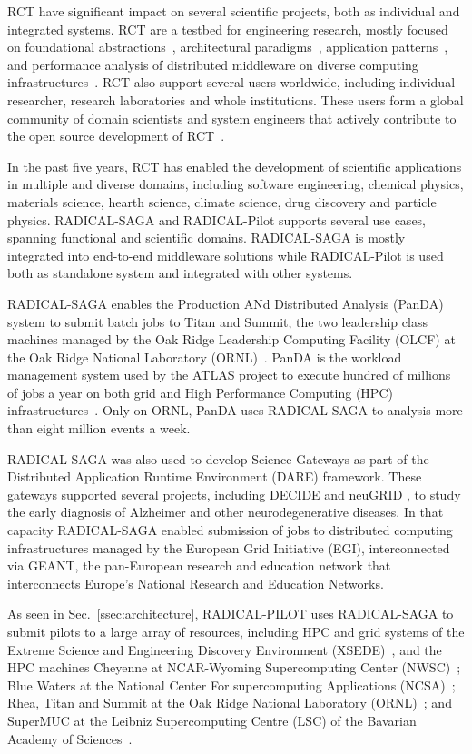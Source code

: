 \documentclass[preprint,12pt, a4paper]{elsarticle}
\begin{document}
RCT have significant impact on several scientific projects, both as
individual and integrated systems. RCT are a testbed for engineering
research, mostly focused on foundational abstractions~\cite{}, architectural
paradigms~\cite{}, application patterns~\cite{}, and performance analysis of
distributed middleware on diverse computing infrastructures~\cite{}. RCT also
support several users worldwide, including individual researcher, research
laboratories and whole institutions. These users form a global community of
domain scientists and system engineers that actively contribute to the open
source development of RCT~\cite{}.

In the past five years, RCT has enabled the development of scientific
applications in multiple and diverse domains, including software engineering,
chemical physics, materials science, hearth science, climate science, drug
discovery and particle physics. RADICAL-SAGA and RADICAL-Pilot supports
several use cases, spanning functional and scientific domains. RADICAL-SAGA
is mostly integrated into end-to-end middleware solutions while RADICAL-Pilot
is used both as standalone system and integrated with other systems.

RADICAL-SAGA enables the Production ANd Distributed Analysis (PanDA) system
to submit batch jobs to Titan and Summit, the two leadership class machines
managed by the Oak Ridge Leadership Computing Facility (OLCF) at the Oak
Ridge National Laboratory (ORNL)~\cite{}. PanDA is the workload management
system used by the ATLAS project to execute hundred of millions of jobs a
year on both grid and High Performance Computing (HPC)
infrastructures~\cite{}. Only on ORNL, PanDA uses RADICAL-SAGA to analysis
more than eight million events a week.

RADICAL-SAGA was also used to develop Science Gateways as part of the
Distributed Application Runtime Environment (DARE) framework. These gateways
supported several projects, including DECIDE and neuGRID , to
study the early diagnosis of Alzheimer and other neurodegenerative diseases.
In that capacity RADICAL-SAGA enabled submission of jobs to distributed
computing infrastructures managed by the European Grid Initiative (EGI),
interconnected via GEANT, the pan-European research and education network
that interconnects Europe’s National Research and Education Networks.


As seen in Sec.~\ref{ssec:architecture}, RADICAL-PILOT uses RADICAL-SAGA to
submit pilots to a large array of resources, including HPC and grid systems
of the Extreme Science and Engineering Discovery Environment
(XSEDE)~\citep{towns2014xsede}, and the HPC machines Cheyenne at NCAR-Wyoming
Supercomputing Center (NWSC)~\citep{web-cheyenne}; Blue Waters at the
National Center For supercomputing Applications
(NCSA)~\citep{web-bluewaters}; Rhea, Titan and Summit at the Oak Ridge
National Laboratory (ORNL)~\citep{web-olcf-resources}; and SuperMUC at the
Leibniz Supercomputing Centre (LSC) of the Bavarian Academy of
Sciences~\citep{web-supermuc}.
\end{document}
